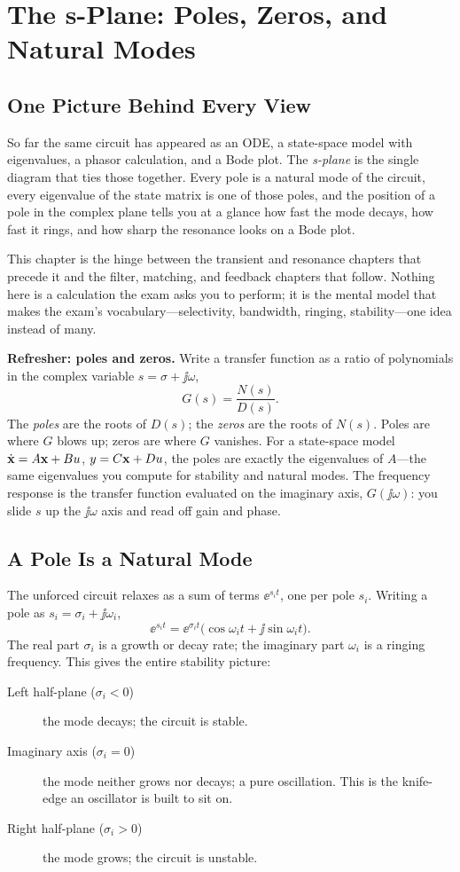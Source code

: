 \chapter{The s-Plane: Poles, Zeros, and Natural Modes}
\label{ch:splane}
\section{One Picture Behind Every View}
So far the same circuit has appeared as an ODE, a state-space model with
eigenvalues, a phasor calculation, and a Bode plot. The \emph{s-plane} is the
single diagram that ties those together. Every pole is a natural mode of the
circuit, every eigenvalue of the state matrix is one of those poles, and the
position of a pole in the complex plane tells you at a glance how fast the mode
decays, how fast it rings, and how sharp the resonance looks on a Bode plot.

This chapter is the hinge between the transient and resonance chapters that
precede it and the filter, matching, and feedback chapters that follow. Nothing
here is a calculation the exam asks you to perform; it is the mental model that
makes the exam's vocabulary---selectivity, bandwidth, ringing, stability---one
idea instead of many.

\begin{controlsbox}
\textbf{Refresher: poles and zeros.} Write a transfer function as a ratio of
polynomials in the complex variable \(s=\sigma+\jj\omega\),
\[
G(s)=\frac{N(s)}{D(s)}.
\]
The \emph{poles} are the roots of \(D(s)\); the \emph{zeros} are the roots of
\(N(s)\). Poles are where \(G\) blows up; zeros are where \(G\) vanishes. For a
state-space model \(\dot{\mathbf{x}}=A\mathbf{x}+Bu\), \(y=C\mathbf{x}+Du\), the poles are
exactly the eigenvalues of \(A\)---the same eigenvalues you compute for stability
and natural modes. The frequency response is the transfer function evaluated on
the imaginary axis, \(G(\jj\omega)\): you slide \(s\) up the \(\jj\omega\) axis
and read off gain and phase.
\end{controlsbox}

\section{A Pole Is a Natural Mode}
The unforced circuit relaxes as a sum of terms \(\ee^{s_i t}\), one per pole
\(s_i\). Writing a pole as \(s_i=\sigma_i+\jj\omega_i\),
\[
\ee^{s_i t}=\ee^{\sigma_i t}\bigl(\cos\omega_i t+\jj\sin\omega_i t\bigr).
\]
The real part \(\sigma_i\) is a growth or decay rate; the imaginary part
\(\omega_i\) is a ringing frequency. This gives the entire stability picture:
\begin{description}
\item[Left half-plane (\(\sigma_i<0\))] the mode decays; the circuit is stable.
\item[Imaginary axis (\(\sigma_i=0\))] the mode neither grows nor decays; a pure
oscillation. This is the knife-edge an oscillator is built to sit on.
\item[Right half-plane (\(\sigma_i>0\))] the mode grows; the circuit is unstable.
\end{description}

